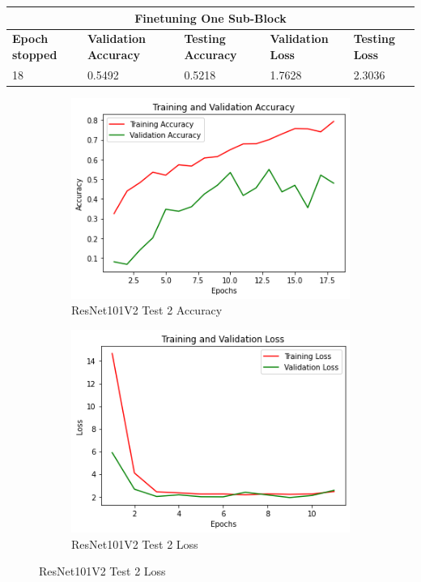 \medskip

\begin{tabular}{ |p{2cm}|p{2cm}|p{2cm}|p{2cm}|p{2cm}|  }
\hline
\multicolumn{5}{|c|}{Finetuning One Sub-Block} \\
\hline
\textbf{Epoch stopped} & \textbf{Validation Accuracy} & \textbf{Testing Accuracy} & \textbf{Validation Loss} & \textbf{Testing Loss} \\
\hline
18 & 0.5492 & 0.5218 & 1.7628 & 2.3036\\
\hline
\end{tabular}

\begin{figure}[H]
	\begin{subfigure}{0.5\textwidth}
		\includegraphics[width=0.9\linewidth]{img/resnet101v2/resnet101ft1acc.png} 
		\caption{ResNet101V2 Test 2 Accuracy}
		\label{fig:resnet101ft1acc}
	\end{subfigure}
	\begin{subfigure}{0.5\textwidth}
		\includegraphics[width=0.9\linewidth]{img/resnet101v2/resnet101feloss.png}
		\caption{ResNet101V2 Test 2 Loss}
		\label{fig:resnet101ft1loss}
	\end{subfigure}
\end{figure}

